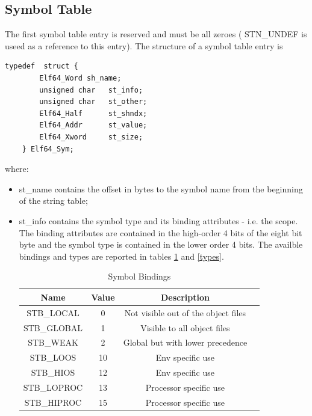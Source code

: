 \documentclass[paper=a4, fontsize=11pt]{report} %
\numberwithin{equation}{section} %
\numberwithin{figure}{section} %
\numberwithin{table}{section} %
\begin{document}
\subsection{Symbol Table}
The first symbol table entry is reserved and must be all zeroes ({\ttfamily 
STN\_UNDEF} is useed as a reference to this entry).
The structure of a symbol table entry is
\begin{lstlisting}[style=ansic, caption={Symbol Table Entry}, label=shdr]
	typedef  struct {
		Elf64_Word sh_name;
		unsigned char 	st_info;
		unsigned char 	st_other;
		Elf64_Half 		st_shndx;
		Elf64_Addr 		st_value;
		Elf64_Xword 	st_size;
	} Elf64_Sym;
\end{lstlisting}
where:
\begin{itemize}
	\item {\ttfamily st\_name} contains the offset in bytes to the symbol name 
	from the beginning of the string table;
	\item {\ttfamily st\_info} contains the symbol type and its binding 
	attributes - i.e. the scope. The binding attributes are contained in the 
	high-order 4 bits of the eight bit byte and the symbol type is contained in 
	the lower order 4 bits. The availble bindings and types are reported in 
	tables \ref{bindings} and \ref{types}.
	\begin{table}[!htbp]
		\begin{center}
			\begin{tabular}{|c|c|c|c|}
				\hline
				\textbf{Name} & \textbf{Value} & \textbf{Description}\\ 
				\hline
				{\ttfamily STB\_LOCAL} & 0 & Not visible out of the object 
				files\\ \hline
				{\ttfamily STB\_GLOBAL} & 1 & Visible to all object files\\ 
				\hline
				{\ttfamily STB\_WEAK} & 2 & Global but with lower precedence\\ 
				\hline
				{\ttfamily STB\_LOOS} & 10 & Env specific use\\ \hline
				{\ttfamily STB\_HIOS} & 12 & Env specific use\\ \hline
				{\ttfamily STB\_LOPROC} & 13 & Processor specific use\\ \hline
				{\ttfamily STB\_HIPROC} & 15 & Processor specific use\\ \hline
			\end{tabular}
			\caption{Symbol Bindings}
			\label{bindings}
		\end{center}
	\end{table}

\end{itemize}
\end{document}
